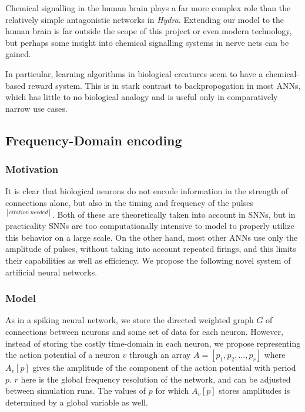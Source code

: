 \documentclass{article}
\begin{document}
Chemical signalling in the human brain plays a far more complex role than the relatively simple antagonistic networks in \textit{Hydra}. Extending our model to the human brain is far outside the scope of this project or even modern technology, but perhaps some insight into chemical signalling systems in nerve nets can be gained.

In particular, learning algorithms in biological creatures seem to have a chemical-based reward system. This is in stark contrast to backpropogation in most ANNs, which has little to no biological analogy and is useful only in comparatively narrow use cases.


\subsection{Frequency-Domain encoding}

\subsubsection{Motivation}

It is clear that biological neurons do not encode information in the strength of connections alone, but also in the timing and frequency of the pulses $^{[citation \ needed]}$. Both of these are theoretically taken into account in SNNs, but in practicality SNNs are too computationally intensive to model to properly utilize this behavior on a large scale. On the other hand, most other ANNs use only the amplitude of pulses, without taking into account repeated firings, and this limits their capabilities as well as efficiency. We propose the following novel system of artificial neural networks.

\subsubsection{Model}

As in a spiking neural network, we store the directed weighted graph $G$ of connections between neurons and some set of data for each neuron. However, instead of storing the costly time-domain in each neuron, we propose representing the action potential of a neuron $v$ through an array $A = [p_1, p_2, \ldots, p_r]$ where $A_v[p]$ gives the amplitude of the component of the action potential with period $p$. $r$ here is the global frequency resolution of the network, and can be adjusted between simulation runs. The values of $p$ for which $A_v[p]$ stores amplitudes is determined by a global variable as well. 
\end{document}
